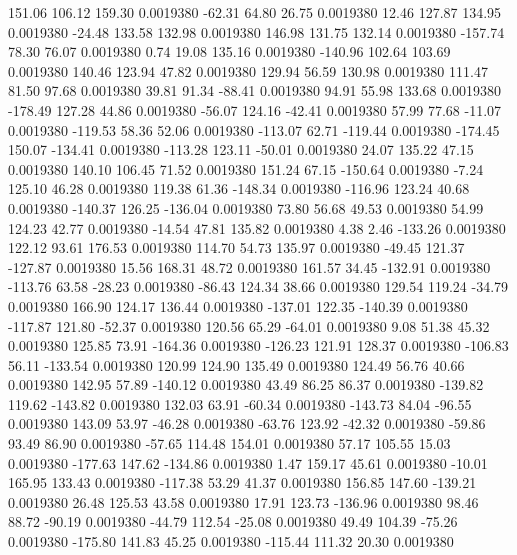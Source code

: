   151.06  106.12  159.30   0.0019380
  -62.31   64.80   26.75   0.0019380
   12.46  127.87  134.95   0.0019380
  -24.48  133.58  132.98   0.0019380
  146.98  131.75  132.14   0.0019380
 -157.74   78.30   76.07   0.0019380
    0.74   19.08  135.16   0.0019380
 -140.96  102.64  103.69   0.0019380
  140.46  123.94   47.82   0.0019380
  129.94   56.59  130.98   0.0019380
  111.47   81.50   97.68   0.0019380
   39.81   91.34  -88.41   0.0019380
   94.91   55.98  133.68   0.0019380
 -178.49  127.28   44.86   0.0019380
  -56.07  124.16  -42.41   0.0019380
   57.99   77.68  -11.07   0.0019380
 -119.53   58.36   52.06   0.0019380
 -113.07   62.71 -119.44   0.0019380
 -174.45  150.07 -134.41   0.0019380
 -113.28  123.11  -50.01   0.0019380
   24.07  135.22   47.15   0.0019380
  140.10  106.45   71.52   0.0019380
  151.24   67.15 -150.64   0.0019380
   -7.24  125.10   46.28   0.0019380
  119.38   61.36 -148.34   0.0019380
 -116.96  123.24   40.68   0.0019380
 -140.37  126.25 -136.04   0.0019380
   73.80   56.68   49.53   0.0019380
   54.99  124.23   42.77   0.0019380
  -14.54   47.81  135.82   0.0019380
    4.38    2.46 -133.26   0.0019380
  122.12   93.61  176.53   0.0019380
  114.70   54.73  135.97   0.0019380
  -49.45  121.37 -127.87   0.0019380
   15.56  168.31   48.72   0.0019380
  161.57   34.45 -132.91   0.0019380
 -113.76   63.58  -28.23   0.0019380
  -86.43  124.34   38.66   0.0019380
  129.54  119.24  -34.79   0.0019380
  166.90  124.17  136.44   0.0019380
 -137.01  122.35 -140.39   0.0019380
 -117.87  121.80  -52.37   0.0019380
  120.56   65.29  -64.01   0.0019380
    9.08   51.38   45.32   0.0019380
  125.85   73.91 -164.36   0.0019380
 -126.23  121.91  128.37   0.0019380
 -106.83   56.11 -133.54   0.0019380
  120.99  124.90  135.49   0.0019380
  124.49   56.76   40.66   0.0019380
  142.95   57.89 -140.12   0.0019380
   43.49   86.25   86.37   0.0019380
 -139.82  119.62 -143.82   0.0019380
  132.03   63.91  -60.34   0.0019380
 -143.73   84.04  -96.55   0.0019380
  143.09   53.97  -46.28   0.0019380
  -63.76  123.92  -42.32   0.0019380
  -59.86   93.49   86.90   0.0019380
  -57.65  114.48  154.01   0.0019380
   57.17  105.55   15.03   0.0019380
 -177.63  147.62 -134.86   0.0019380
    1.47  159.17   45.61   0.0019380
  -10.01  165.95  133.43   0.0019380
 -117.38   53.29   41.37   0.0019380
  156.85  147.60 -139.21   0.0019380
   26.48  125.53   43.58   0.0019380
   17.91  123.73 -136.96   0.0019380
   98.46   88.72  -90.19   0.0019380
  -44.79  112.54  -25.08   0.0019380
   49.49  104.39  -75.26   0.0019380
 -175.80  141.83   45.25   0.0019380
 -115.44  111.32   20.30   0.0019380
